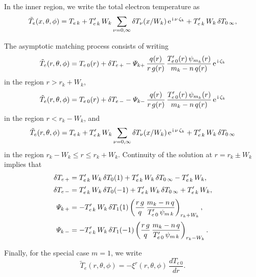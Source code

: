 \documentclass[12pt,prb,aps,notitlepage]{revtex4-1}
\begin{document}
In the inner region, we write the total electron temperature as 
\begin{equation}
\tilde{T}_e(x, \theta,\phi)=T_{e\,k} +T_{e\,k}'\,W_k\sum_{\nu=0,\infty}\delta T_\nu(x/W_k)\,{\rm e}^{\,{\rm i}\,\nu\,\zeta_k}+T_{e\,k}'\,W_k\,\delta T_{0\,\infty},
\end{equation}

The asymptotic matching process consists of writing
\begin{equation}
\tilde{T}_e(r,\theta,\phi) = T_{e\,0}(r) + \delta T_{e\,+} - {\mit\Psi}_{k+}\,\frac{q(r)}{r\,g(r)}\,\frac{T_{e\,0}'(r)\,\psi_{m_k}(r)}{m_k-n\,q(r)}\,{\rm e}^{\,{\rm i}\,\zeta_k}
\end{equation}
in the region $r>r_k+W_k$, 
\begin{equation}
\tilde{T}_e(r,\theta,\phi) = T_{e\,0}(r) + \delta T_{e\,-} - {\mit\Psi}_{k-}\,\frac{q(r)}{r\,g(r)}\,\frac{T_{e\,0}'(r)\,\psi_{m_k}(r)}{m_k-n\,q(r)}\,{\rm e}^{\,{\rm i}\,\zeta_k}
\end{equation}
in the region $r< r_k-W_k$, and 
\begin{equation}
\tilde{T}_e(r, \theta,\phi)=T_{e\,k} +T_{e\,k}'\,W_k\sum_{\nu=0,\infty}\delta T_\nu(x/W_k)\,{\rm e}^{\,{\rm i}\,\nu\,\zeta_k}+T_{e\,k}'\,W_k\,\delta T_{0\,\infty}
\end{equation}
in the region $r_k-W_k \leq r\leq r_k+W_k$. Continuity of the solution at $r=r_k\pm W_k$ implies that
\begin{align}
\delta T_{e\,+} &= T_{e\,k}'\,W_k\,\delta T_{0}(1)+T_{e\,k}'\,W_k\,\delta T_{0\,\infty} - T_{e\,k}'\,W_k,\\[0.5ex]
\delta T_{e\,-} &= T_{e\,k}'\,W_k\,\delta T_{0}(-1) +T_{e\,k}'\,W_k\,\delta T_{0\,\infty}+ T_{e\,k}'\,W_k,\\[0.5ex]
{\mit\Psi}_{k\,+} &= - T_{e\,k}'\,W_k\,\delta T_1(1)\left(\frac{r\,g}{q}\,\frac{m_k-n\,q}{T_{e\,0}'\,\psi_{m\,k}}\right)_{r_k+W_k},\\[0.5ex]
{\mit\Psi}_{k\,-} &=- T_{e\,k}'\,W_k\,\delta T_1(-1)\left(\frac{r\,g}{q}\,\frac{m_k-n\,q}{T_{e\,0}'\,\psi_{m\,k}}\right)_{r_k-W_k}.
\end{align}

Finally, for the special case $m=1$, we write
\begin{equation}
\tilde{T}_e(r,\theta,\phi) = - \xi^r(r,\theta,\phi)\,\frac{dT_{e\,0}}{dr}.
\end{equation}
\end{document}
